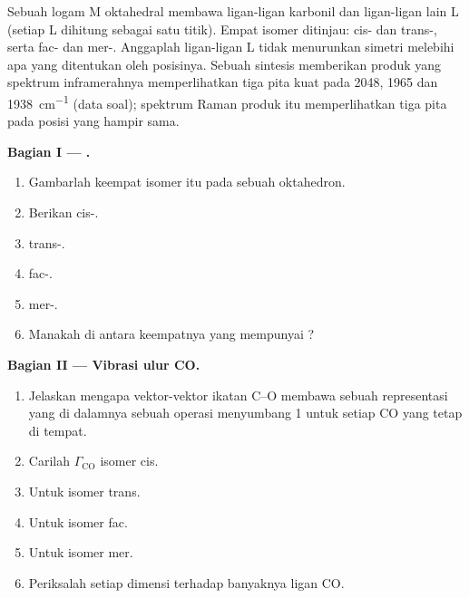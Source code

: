 \begin{problem}
\label{pb:b3:group-theory-applied:1}
Sebuah logam M oktahedral membawa ligan-ligan karbonil dan ligan-ligan lain
L (setiap L dihitung sebagai satu titik). Empat isomer ditinjau: cis- dan
trans-, serta fac- dan mer-. Anggaplah ligan-ligan L
tidak menurunkan simetri melebihi apa yang ditentukan oleh posisinya. Sebuah
sintesis  memberikan produk yang spektrum inframerahnya
memperlihatkan tiga pita kuat pada 2048, 1965 dan \qty{1938}{cm^{-1}} (data
soal); spektrum Raman produk itu memperlihatkan tiga pita pada posisi yang hampir
sama.

\medskip\noindent\textbf{Bagian I --- .}
\begin{enumerate}[beginpenalty=10000]
  \item Gambarlah keempat isomer itu pada sebuah oktahedron.
  \item Berikan  cis-.
  \item {} trans-.
  \item {} fac-.
  \item {} mer-.
  \item Manakah di antara keempatnya yang mempunyai ?
\end{enumerate}

\medskip\noindent\textbf{Bagian II --- Vibrasi ulur CO.}
\begin{enumerate}[resume, beginpenalty=10000]
  \item Jelaskan mengapa vektor-vektor ikatan C--O membawa sebuah representasi
        yang di dalamnya sebuah operasi menyumbang 1 untuk setiap CO yang tetap
        di tempat.
  \item Carilah $\Gamma_{\mathrm{CO}}$ isomer cis.
  \item Untuk isomer trans.
  \item Untuk isomer fac.
  \item Untuk isomer mer.
  \item Periksalah setiap dimensi terhadap banyaknya ligan CO.
\end{enumerate}


\end{problem}
